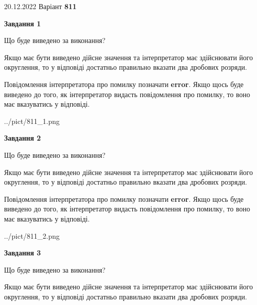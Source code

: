 \documentclass[12pt, ukrainian]{article}
\begin{document}
{20.12.2022 Варіант \No \textbf { 811 }\par}
{
\begin {Large}

{\begin {center}\textbf{Завдання 1}\end {center}}\par
Що буде виведено за виконання? \par

Якщо має бути виведено дійсне значення та інтерпретатор має здійснювати його округлення, 
то у відповіді достатньо правильно вказати два дробових розряди.

Повідомлення інтерпретатора про помилку позначати \textbf{error}.
Якщо щось буде виведено до того, як інтерпретатор видасть повідомлення про помилку, 
то воно має вказуватись у відповіді. \par

\begin{center}
	{../pict/811_1.png}
\end{center}
\newpage

{\begin {center}\textbf{Завдання 2}\end {center}}\par
Що буде виведено за виконання? \par

Якщо має бути виведено дійсне значення та інтерпретатор має здійснювати його округлення, 
то у відповіді достатньо правильно вказати два дробових розряди.

Повідомлення інтерпретатора про помилку позначати \textbf{error}.
Якщо щось буде виведено до того, як інтерпретатор видасть повідомлення про помилку, 
то воно має вказуватись у відповіді. \par

\begin{center}
	{../pict/811_2.png}
\end{center}
\newpage

{\begin {center}\textbf{Завдання 3}\end {center}}\par
Що буде виведено за виконання? \par

Якщо має бути виведено дійсне значення та інтерпретатор має здійснювати його округлення, 
то у відповіді достатньо правильно вказати два дробових розряди.


\end{Large}}
\end{document}
